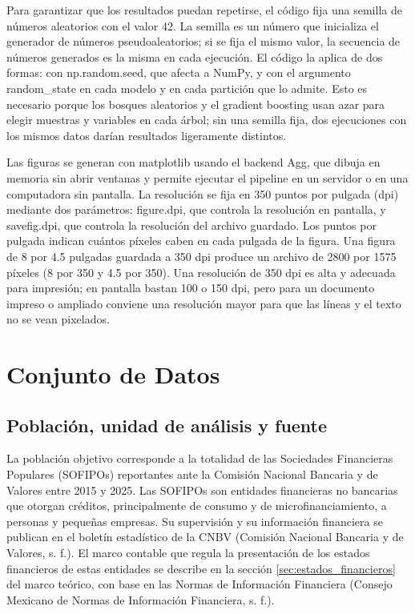 Para garantizar que los resultados puedan repetirse, el código fija una semilla de números aleatorios con el valor 42. La semilla es un número que inicializa el generador de números pseudoaleatorios; si se fija el mismo valor, la secuencia de números generados es la misma en cada ejecución. El código la aplica de dos formas: con np.random.seed, que afecta a NumPy, y con el argumento random\_state en cada modelo y en cada partición que lo admite. Esto es necesario porque los bosques aleatorios y el gradient boosting usan azar para elegir muestras y variables en cada árbol; sin una semilla fija, dos ejecuciones con los mismos datos darían resultados ligeramente distintos. %

Las figuras se generan con matplotlib usando el backend Agg, que dibuja en memoria sin abrir ventanas y permite ejecutar el pipeline en un servidor o en una computadora sin pantalla. La resolución se fija en 350 puntos por pulgada (dpi) mediante dos parámetros: figure.dpi, que controla la resolución en pantalla, y savefig.dpi, que controla la resolución del archivo guardado. Los puntos por pulgada indican cuántos píxeles caben en cada pulgada de la figura. Una figura de 8 por 4.5 pulgadas guardada a 350 dpi produce un archivo de 2800 por 1575 píxeles (8 por 350 y 4.5 por 350). Una resolución de 350 dpi es alta y adecuada para impresión; en pantalla bastan 100 o 150 dpi, pero para un documento impreso o ampliado conviene una resolución mayor para que las líneas y el texto no se vean pixelados.

\section{Conjunto de Datos}

\subsection{Población, unidad de análisis y fuente}
La población objetivo corresponde a la totalidad de las Sociedades Financieras Populares (SOFIPOs) reportantes ante la Comisión Nacional Bancaria y de Valores entre 2015 y 2025. Las SOFIPOs son entidades financieras no bancarias que otorgan créditos, principalmente de consumo y de microfinanciamiento, a personas y pequeñas empresas. Su supervisión y su información financiera se publican en el boletín estadístico de la CNBV (Comisión Nacional Bancaria y de Valores, s. f.). El marco contable que regula la presentación de los estados financieros de estas entidades se describe en la sección \ref{sec:estados_financieros} del marco teórico, con base en las Normas de Información Financiera (Consejo Mexicano de Normas de Información Financiera, s. f.).

